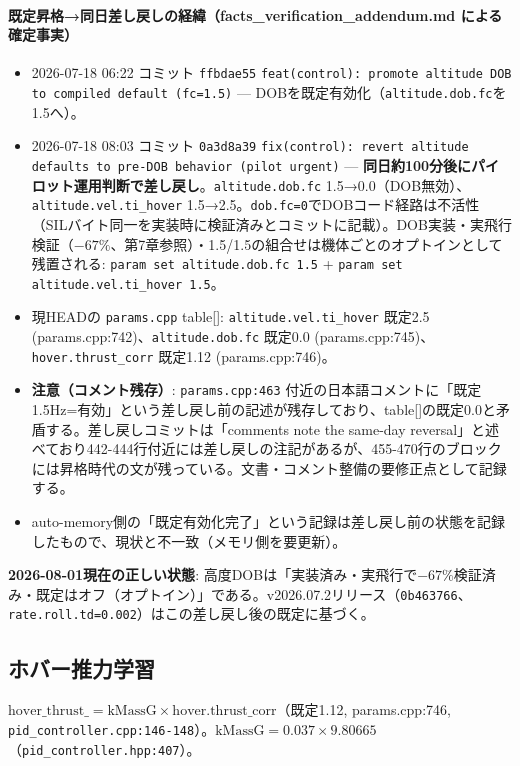 \documentclass[a4paper,10pt]{ltjsarticle}
\begin{document}
\paragraph{既定昇格→同日差し戻しの経緯（facts\_verification\_addendum.md による確定事実）}

\begin{itemize}[leftmargin=*]
  \item 2026-07-18 06:22 コミット \texttt{ffbdae55} \texttt{feat(control): promote altitude DOB to compiled default (fc=1.5)} --- DOBを既定有効化（\texttt{altitude.dob.fc}を1.5へ）。
  \item 2026-07-18 08:03 コミット \texttt{0a3d8a39} \texttt{fix(control): revert altitude defaults to pre-DOB behavior (pilot urgent)} --- \textbf{同日約100分後にパイロット運用判断で差し戻し}。\texttt{altitude.dob.fc} 1.5→0.0（DOB無効）、\texttt{altitude.vel.ti\_hover} 1.5→2.5。\texttt{dob.fc=0}でDOBコード経路は不活性（SILバイト同一を実装時に検証済みとコミットに記載）。DOB実装・実飛行検証（$-67\%$、第7章参照）・1.5/1.5の組合せは機体ごとのオプトインとして残置される: \texttt{param set altitude.dob.fc 1.5} + \texttt{param set altitude.vel.ti\_hover 1.5}。
  \item 現HEADの \texttt{params.cpp} table[]: \texttt{altitude.vel.ti\_hover} 既定2.5 (params.cpp:742)、\texttt{altitude.dob.fc} 既定0.0 (params.cpp:745)、\texttt{hover.thrust\_corr} 既定1.12 (params.cpp:746)。
  \item \textbf{注意（コメント残存）}: \texttt{params.cpp:463} 付近の日本語コメントに「既定1.5Hz=有効」という差し戻し前の記述が残存しており、table[]の既定0.0と矛盾する。差し戻しコミットは「comments note the same-day reversal」と述べており442-444行付近には差し戻しの注記があるが、455-470行のブロックには昇格時代の文が残っている。文書・コメント整備の要修正点として記録する。
  \item auto-memory側の「既定有効化完了」という記録は差し戻し前の状態を記録したもので、現状と不一致（メモリ側を要更新）。
\end{itemize}

\textbf{2026-08-01現在の正しい状態}: 高度DOBは「実装済み・実飛行で$-67\%$検証済み・既定はオフ（オプトイン）」である。v2026.07.2リリース（\texttt{0b463766}、\texttt{rate.roll.td=0.002}）はこの差し戻し後の既定に基づく。

\subsection{ホバー推力学習}

$\mathrm{hover\_thrust\_} = \mathrm{kMassG} \times \mathrm{hover.thrust\_corr}$（既定1.12, params.cpp:746, \texttt{pid\_controller.cpp:146-148}）。$\mathrm{kMassG} = 0.037 \times 9.80665$（\texttt{pid\_controller.hpp:407}）。
\end{document}
